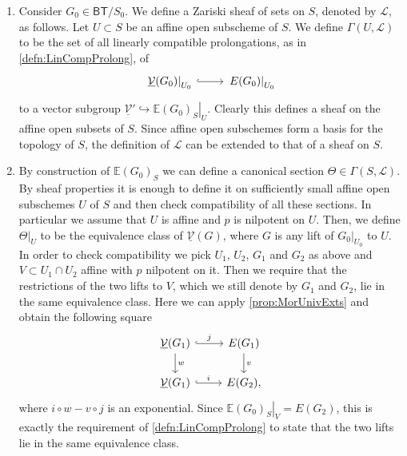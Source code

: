 \begin{rem}[]\leavevmode\vspace{-.2\baselineskip}
\begin{enumerate}
	\item Consider $G_0 \in \mathsf{BT}/S_0$.
		We define a Zariski sheaf of sets on $S$, denoted by $\mathscr{L}$,
		as follows.
		Let $U \subset S$ be an affine open subscheme of $S$.
		We define $\Gamma(U,\mathscr{L})$ to be the set of all linearly compatible prolongations,
		as in \cref{defn:LinCompProlong}, of
		\begin{equation*}
		\begin{tikzcd}[row sep = 0ex
			,/tikz/column 1/.append style={anchor=base east}
			,/tikz/column 2/.append style={anchor=base west}]
			\left.\underline{\mathcal{V}}(G_0)\right|_{U_0} \arrow[r, "", hookrightarrow] &
			\left.E(G_0)\right|_{U_0}
		\end{tikzcd}
		\end{equation*} 
		to a vector subgroup $\underline{\mathcal{V}}' \hookrightarrow 
		\left.\mathbb{E}(G_0)_S\right|_{U}$.
		Clearly this defines a sheaf on the affine open subsets of $S$.
		Since affine open subschemes form a basis for the topology of $S$, the definition
		of $\mathscr{L}$ can be extended to that of a sheaf on $S$.

	\item By construction of $\mathbb{E}(G_0)_S$ we can define a canonical
		section $\Theta \in \Gamma(S, \mathscr{L})$.
		By sheaf properties it is enough to define it on sufficiently small
		affine open subschemes $U$ of $S$ and then check compatibility of all
		these sections.
		In particular we assume that $U$ is affine and $p$ is nilpotent on $U$.
		Then, we define $\left.\Theta\right|_{ U }$ to be the equivalence class
		of $\underline{\mathcal{V}}(G)$, where $G$ is any lift of $\left.G_0\right|_{ U_0 }$
		to $U$.
		In order to check compatibility we pick $U_1$, $U_2$, $G_1$ and $G_2$
		as above and $V \subset U_1 \cap U_2$ affine
		with $p$ nilpotent on it.
		Then we require that the restrictions of the two lifts to $V$,
		which we still denote by $G_1$ and $G_2$, lie in the same equivalence class.
		Here we can apply \cref{prop:MorUnivExts} and obtain the following
		square
		\begin{equation*}
		\begin{tikzcd}
			\underline{\mathcal{V}}(G_1) \arrow[r, "j", hookrightarrow] 
			\arrow[d, "w", rightarrow] &
			E(G_1) \arrow[d, "v", rightarrow] \\
			\underline{\mathcal{V}}(G_1) \arrow[r, "i", hookrightarrow] &
			E(G_2)
		,\end{tikzcd}
		\end{equation*}
		where $i \circ w - v \circ j$ is an exponential.
		Since $\left.\mathbb{E}(G_0)_S\right|_{ V } = E(G_2)$,
		this is exactly the requirement of \cref{defn:LinCompProlong} 
		to state that the two lifts lie in the same equivalence class.


\end{enumerate}
\end{rem}
